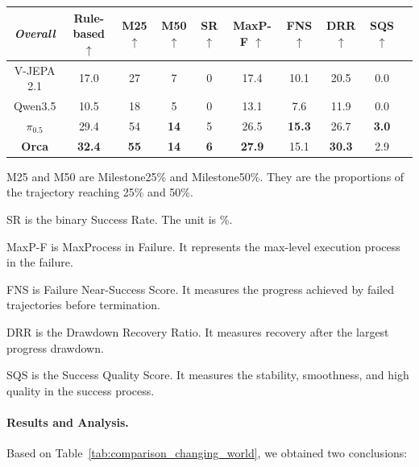 \begin{table}[t]
\begin{threeparttable}
\begin{tabular}{c|c|cccccccc}
    \multicolumn{1}{c}{\textbf{\textit{Overall}}} &  Rule-based $\uparrow$   & M25 $\uparrow$ & M50 $\uparrow$ & SR $\uparrow$ & MaxP-F $\uparrow$ & FNS $\uparrow$ & DRR $\uparrow$  & SQS $\uparrow$ \\
    \midrule[0.5pt]
    V-JEPA 2.1 & 17.0  & 27    & 7     & 0     & 17.4  & 10.1    & 20.5  & 0.0 \\
    Qwen3.5 & 10.5  & 18    & 5     & 0     & 13.1  & 7.6     & 11.9  & 0.0 \\
    $\pi_{0.5}$  & 29.4  & 54    & \textbf{14} & 5     & 26.5  & \textbf{15.3}   & 26.7  & \textbf{3.0} \\
    \rowcolor[rgb]{ .89,  .949,  .851}\textbf{Orca} & \textbf{32.4} & \textbf{55} & \textbf{14}    & \textbf{6} & \textbf{27.9} & 15.1 & \textbf{30.3} & 2.9 \\
    \bottomrule[1pt]
    \end{tabular}%
    \begin{tablenotes}
        \footnotesize
        \item[1] M25 and M50 are Milestone25\% and Milestone50\%. They are the proportions of the trajectory reaching 25\% and 50\%.
        \item[2] SR is the binary Success Rate. The unit is \%.
        \item[3] MaxP-F is MaxProcess in Failure. It represents the max-level execution process in the failure.
        \item[4] FNS is Failure Near-Success Score. It measures the progress achieved by failed trajectories before termination.
        \item[5] DRR is the Drawdown Recovery Ratio. It measures recovery after the largest progress drawdown.
        \item[6] SQS is the Success Quality Score. It measures the stability, smoothness, and high quality in the success process.
    \end{tablenotes}
  \end{threeparttable}
\end{table}%


\paragraph{Results and Analysis.} 
Based on Table~\ref{tab:comparison_changing_world}, we obtained two conclusions:



